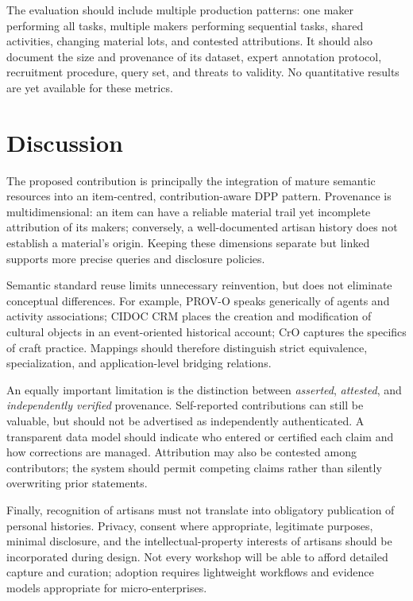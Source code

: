 \documentclass[conference]{IEEEtran}
\begin{document}
The evaluation should include multiple production patterns: one maker performing all tasks, multiple makers performing sequential tasks, shared activities, changing material lots, and contested attributions. It should also document the size and provenance of its dataset, expert annotation protocol, recruitment procedure, query set, and threats to validity. No quantitative results are yet available for these metrics.

\section{Discussion}
The proposed contribution is principally the integration of mature semantic resources into an item-centred, contribution-aware DPP pattern. Provenance is multidimensional: an item can have a reliable material trail yet incomplete attribution of its makers; conversely, a well-documented artisan history does not establish a material's origin. Keeping these dimensions separate but linked supports more precise queries and disclosure policies.

Semantic standard reuse limits unnecessary reinvention, but does not eliminate conceptual differences. For example, PROV-O speaks generically of agents and activity associations; CIDOC CRM places the creation and modification of cultural objects in an event-oriented historical account; CrO captures the specifics of craft practice. Mappings should therefore distinguish strict equivalence, specialization, and application-level bridging relations.

An equally important limitation is the distinction between \emph{asserted}, \emph{attested}, and \emph{independently verified} provenance. Self-reported contributions can still be valuable, but should not be advertised as independently authenticated. A transparent data model should indicate who entered or certified each claim and how corrections are managed. Attribution may also be contested among contributors; the system should permit competing claims rather than silently overwriting prior statements.

Finally, recognition of artisans must not translate into obligatory publication of personal histories. Privacy, consent where appropriate, legitimate purposes, minimal disclosure, and the intellectual-property interests of artisans should be incorporated during design. Not every workshop will be able to afford detailed capture and curation; adoption requires lightweight workflows and evidence models appropriate for micro-enterprises.
\end{document}
